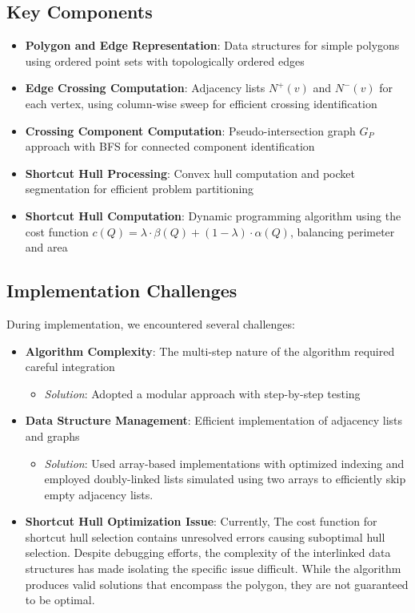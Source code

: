 \documentclass[11pt]{article}
\begin{document}
\subsection{Key Components}
\begin{itemize}
    \item \textbf{Polygon and Edge Representation}: Data structures for simple polygons using ordered point sets with topologically ordered edges
    \item \textbf{Edge Crossing Computation}: Adjacency lists $N^+(v)$ and $N^-(v)$ for each vertex, using column-wise sweep for efficient crossing identification
    \item \textbf{Crossing Component Computation}: Pseudo-intersection graph $G_P$ approach with BFS for connected component identification
    \item \textbf{Shortcut Hull Processing}: Convex hull computation and pocket segmentation for efficient problem partitioning
    \item \textbf{Shortcut Hull Computation}: Dynamic programming algorithm using the cost function $c(Q) = \lambda \cdot \beta(Q) + (1 - \lambda) \cdot \alpha(Q)$, balancing perimeter and area
\end{itemize}

\subsection{Implementation Challenges}
During implementation, we encountered several challenges:

\begin{itemize}
    \item \textbf{Algorithm Complexity}: The multi-step nature of the algorithm required careful integration
    \begin{itemize}
        \item \textit{Solution}: Adopted a modular approach with step-by-step testing
    \end{itemize}
    
    \item \textbf{Data Structure Management}: Efficient implementation of adjacency lists and graphs
    \begin{itemize}
        \item \textit{Solution}: Used array-based implementations with optimized indexing and employed
doubly-linked lists simulated using two arrays to efficiently skip empty adjacency lists.
    \end{itemize}
    
    \item \textbf{Shortcut Hull Optimization Issue}: Currently, The cost function for shortcut hull selection contains unresolved errors causing suboptimal hull selection. Despite debugging efforts, the complexity of the interlinked data structures has made isolating the specific issue difficult. While the algorithm produces valid solutions that encompass the polygon, they are not guaranteed to be optimal.
    \end{itemize}
\end{document}
